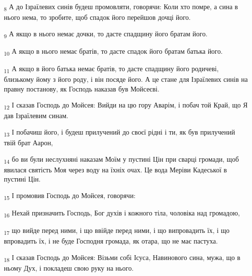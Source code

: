 \begin{tcolorbox}
\textsubscript{8} А до Ізраїлевих синів будеш промовляти, говорячи: Коли хто помре, а сина в нього нема, то зробите, щоб спадок його перейшов дочці його.
\end{tcolorbox}
\begin{tcolorbox}
\textsubscript{9} А якщо в нього немає дочки, то дасте спадщину його братам його.
\end{tcolorbox}
\begin{tcolorbox}
\textsubscript{10} А якщо в нього немає братів, то дасте спадок його братам батька його.
\end{tcolorbox}
\begin{tcolorbox}
\textsubscript{11} А якщо в його батька немає братів, то дасте спадщину його родичеві, близькому йому з його роду, і він посяде його. А це стане для Ізраїлевих синів на правну постанову, як Господь наказав був Мойсеєві.
\end{tcolorbox}
\begin{tcolorbox}
\textsubscript{12} І сказав Господь до Мойсея: Вийди на цю гору Аварім, і побач той Край, що Я дав Ізраїлевим синам.
\end{tcolorbox}
\begin{tcolorbox}
\textsubscript{13} І побачиш його, і будеш прилучений до своєї рідні і ти, як був прилучений твій брат Аарон,
\end{tcolorbox}
\begin{tcolorbox}
\textsubscript{14} бо ви були неслухняні наказам Моїм у пустині Цін при сварці громади, щоб явилася святість Моя через воду на їхніх очах. Це вода Меріви Кадеської в пустині Цін.
\end{tcolorbox}
\begin{tcolorbox}
\textsubscript{15} І промовив Господь до Мойсея, говорячи:
\end{tcolorbox}
\begin{tcolorbox}
\textsubscript{16} Нехай призначить Господь, Бог духів і кожного тіла, чоловіка над громадою,
\end{tcolorbox}
\begin{tcolorbox}
\textsubscript{17} що вийде перед ними, і що ввійде перед ними, і що випровадить їх, і що впровадить їх, і не буде Господня громада, як отара, що не має пастуха.
\end{tcolorbox}
\begin{tcolorbox}
\textsubscript{18} І сказав Господь до Мойсея: Візьми собі Ісуса, Навинового сина, мужа, що в ньому Дух, і покладеш свою руку на нього.
\end{tcolorbox}
